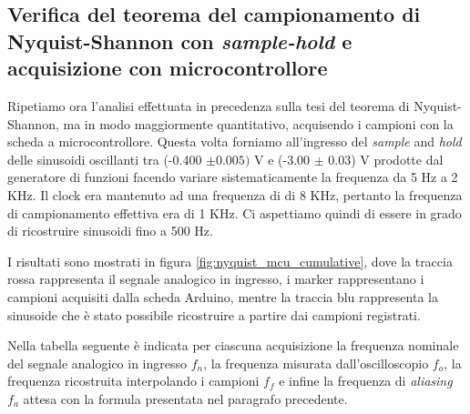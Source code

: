 \documentclass[journal]{IEEEtran}
\begin{document}
\subsection{Verifica del teorema del campionamento di Nyquist-Shannon con \textit{sample-hold} e acquisizione con microcontrollore}

Ripetiamo ora l'analisi effettuata in precedenza sulla tesi del teorema di Nyquist-Shannon, ma in modo maggiormente quantitativo, acquisendo i campioni con la scheda a microcontrollore. Questa volta forniamo all'ingresso del \textit{sample} and \textit{hold} delle sinusoidi oscillanti tra (-0.400 $\pm 0.005)$  V e (-3.00 $\pm$ 0.03) V prodotte dal generatore di funzioni facendo variare sistematicamente la frequenza da 5 Hz a 2 KHz. Il clock era mantenuto ad una frequenza di di 8 KHz, pertanto la frequenza di campionamento effettiva era di 1 KHz. Ci aspettiamo quindi di essere in grado di ricostruire sinusoidi fino a 500 Hz.

I risultati sono mostrati in figura \ref{fig:nyquist_mcu_cumulative}, dove la traccia rossa rappresenta il segnale analogico in ingresso, i marker rappresentano i campioni acquisiti dalla scheda Arduino, mentre la traccia blu rappresenta la sinusoide che è stato possibile ricostruire a partire dai campioni registrati.

Nella tabella seguente è indicata per ciascuna acquisizione la frequenza nominale del segnale analogico in ingresso $f_n$, la frequenza misurata dall'oscilloscopio $f_o$, la frequenza ricostruita interpolando i campioni $f_f$ e infine la frequenza di \textit{aliasing} $f_a$ attesa con la formula presentata nel paragrafo precedente.

\end{document}
